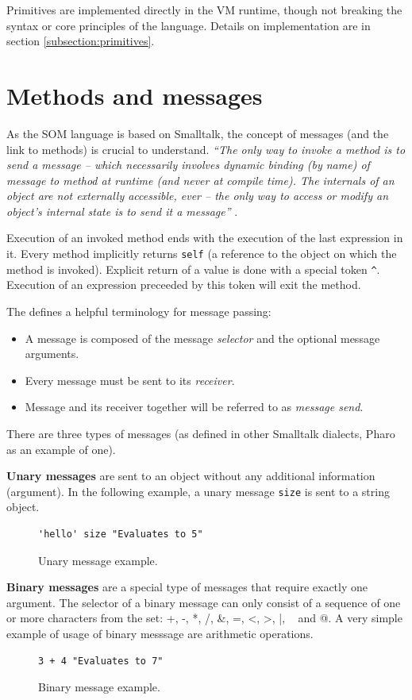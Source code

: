 \documentclass[thesis=M,english]{FITthesis}[2019/12/23]
\begin{document}
Primitives are implemented directly in the VM runtime, though not breaking the syntax or core principles of the
language. Details on implementation are in section \ref{subsection:primitives}.

\section{Methods and messages}
As the SOM language is based on Smalltalk, the concept of messages (and the link to methods) is crucial to understand.
\textit{``The only way to invoke a method is to send a message -- which necessarily involves dynamic binding
(by name) of message to method at runtime (and never at compile time). The internals of an object are not
externally accessible, ever -- the only way to access or modify an object's internal state is to send it
a message''} \cite{smalltalk-essentials}.

Execution of an invoked method ends with the execution of the last expression in it. Every method implicitly
returns \texttt{self} (a reference to the object on which the method is invoked). Explicit return of a value
is done with a special token \texttt{\^}. Execution of an expression preceeded by this token will exit the method.

The \cite{pharo-by-example} defines a helpful terminology for message passing:
\begin{itemize}
	\item A message is composed of the message \textit{selector} and the optional message arguments.
	\item Every message must be sent to its \textit{receiver}.
	\item Message and its receiver together will be referred to as \textit{message send}.
\end{itemize}

There are three types of messages (as defined in other Smalltalk dialects, Pharo as an example of one).

\textbf{Unary messages} are sent to an object without any additional information (argument). In the following
example, a unary message \texttt{size} is sent to a string object.
\begin{figure}[h!]
\begin{lstlisting}[language=Smalltalk]
	'hello' size "Evaluates to 5"
\end{lstlisting}
\caption{Unary message example.}
\end{figure}

\textbf{Binary messages} are a special type of messages that require exactly one argument. The selector
of a binary message can only consist of a sequence of one or more characters from the set: +, -, *, /,
\&, =, \textless, \textgreater, |, ~ and @. A very simple example of usage of binary messsage are arithmetic operations.
\begin{figure}[h!]
\begin{lstlisting}[language=Smalltalk]
	3 + 4 "Evaluates to 7"
\end{lstlisting}
\caption{Binary message example.}
\end{figure}
\end{document}
